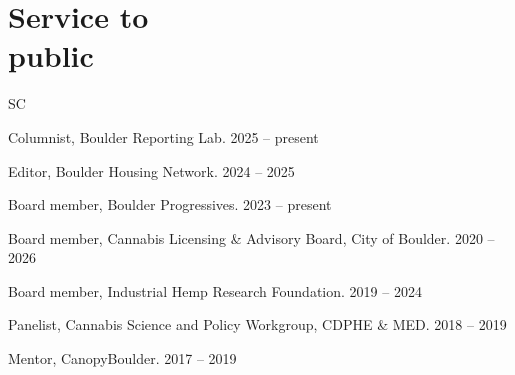 \documentclass{cv}
\begin{document}
	\section{Service to\\public}
	\begin{entries}{SC}
		\item Columnist, Boulder Reporting Lab. \hfill 2025 -- present
		\item Editor, Boulder Housing Network. \hfill 2024 -- 2025
		\item Board member, Boulder Progressives. \hfill 2023 -- present
		\item Board member, Cannabis Licensing \& Advisory Board, City of Boulder. \hfill 2020 -- 2026
		\item Board member, Industrial Hemp Research Foundation. \hfill 2019 -- 2024
		\item Panelist, Cannabis Science and Policy Workgroup, CDPHE \& MED. \hfill 2018 -- 2019
		\item Mentor, CanopyBoulder. \hfill 2017 -- 2019
	\end{entries}
\end{document}
